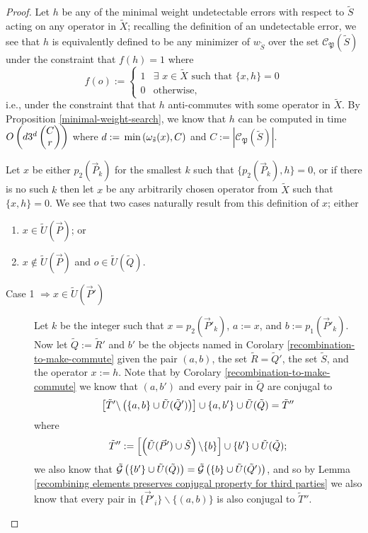 \documentclass[twocolumn,showpacs,preprintnumbers,amsmath,amssymb,nofootinbib,pra,floatfix]{revtex4-1}
\newcommand{\lst}{\vec}
\newcommand{\set}{\tilde}
\newcommand{\genfun}{\tilde{\mathcal{G}}}
\newcommand{\pauligroup}{\mathfrak{P}}
\newcommand{\centralizer}{\mathcal{C}}
\begin{document}
\begin{proof}

Let $h$ be any of the minimal weight undetectable errors with respect to $\set S$ acting on any operator in $\set X$;  recalling the definition of an undetectable error, we see that $h$ is equivalently defined to be any minimizer of $w_{\set S}$ over the set $\centralizer_\pauligroup(\set S)$ under the constraint that $f(h)=1$ where 
$$f(o):=
\begin{cases}
1 & \exists\,\, x\in\set X \,\,\text{such that}\,\, \{x,h\}=0\\
0 & \text{otherwise},
\end{cases}
$$
i.e., under the constraint that that $h$ anti-commutes with some operator in $\set X$.  By Proposition \ref{minimal-weight-search}, we know that $h$ can be computed in time $O\left(d3^d\left(\begin{matrix}C\\r\end{matrix}\right)\right)$ where $d:=\min\paren{\om_{\set s}(x),C}$ and $C:=\left|\centralizer_\pauligroup(\set S)\right|$.

Let $x$ be either $p_2(\lst P_k)$ for the smallest $k$ such that $\{p_2(\lst P_k),h\}=0$, or if there is no such $k$ then let $x$ be any arbitrarily chosen operator from $\set X$ such that $\{x,h\}=0$.  We see that two cases naturally result from this definition of $x$;  either
\begin{enumerate}
\item $x\in \set U(\lst P)$; or
\item $x\notin \set U(\lst P)$ and $o\in\set U(\set Q)$.
\end{enumerate}

\begin{description}
\item[Case 1 $\Rightarrow x\in\set U(\lst P')$]
Let $k$ be the integer such that $x=p_2(\lst P'_k)$, $a := x$, and $b:=p_1(\lst P'_k)$.  Now let $\set Q:=\set R'$ and $b'$ be the objects named in Corolary \ref{recombination-to-make-commute} given the pair $(a,b)$, the set $\set R=\set Q'$, the set $\set S$, and the operator $x:=h$.  Note that by Corolary \ref{recombination-to-make-commute} we know that $(a,b')$ and every pair in $\set Q$ are conjugal to
$$\left[\set T'\backslash\paren{\{a,b\} \cup \set U(\set Q')}\right]\cup \{a,b'\} \cup \set U(\set Q)=\set T''$$
where
$$\set T'':=\left[\paren{\set U(\lst P')\cup \set S}\backslash\{b\}\right]\cup \{b'\} \cup \set U(\set Q);$$
we also know that $\genfun\paren{\{b'\}\cup \set U(\set Q)}=\genfun\paren{\{b\}\cup \set U(\set Q')}$, and so by Lemma \ref{recombining elements preserves conjugal property for third parties} we also know that every pair in $\{\lst P'_i\}\backslash\{(a,b)\}$ is also conjugal to $\set T''$.


\end{description}
\end{proof}
\end{document}

